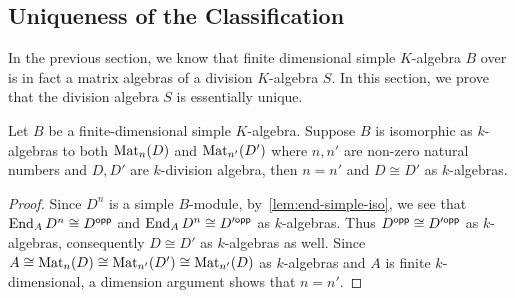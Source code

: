 \subsection{Uniqueness of the Classification}\label{sec:wed-artin-unique}
In the previous section, we know that finite dimensional simple $K$-algebra $B$
over is in fact a matrix algebras of a division $K$-algebra $S$. In this
section, we prove that the division algebra $S$ is essentially unique.

\begin{theorem}\label{thm:wed-artin-uniq}
  Let $B$ be a
  finite-dimensional simple $K$-algebra. Suppose $B$ is isomorphic as
  $k$-algebras to both $\operatorname{Mat}_{n}(D)$ and $\operatorname{Mat}_{n'}(D')$ where $n, n'$ are
  non-zero natural numbers and $D, D'$ are $k$-division algebra, then $n = n'$
  and $D \cong D'$ as $k$-algebras.\label{thm:wed-artin-unique} \leanok
\end{theorem}

\begin{proof}
  Since $D^{n}$ is a simple $B$-module, by~\cref{lem:end-simple-iso}, we see
  that $\operatorname{End}_{A}D^{n}\cong D^{\mathsf{opp}}$ and $\operatorname{End}_{A}D^{n}\cong D'^{\mathsf{opp}}$ as
  $k$-algebras. Thus $D^{\mathsf{opp}}\cong D'^{\mathsf{opp}}$ as $k$-algebras, consequently
  $D\cong D'$ as $k$-algebras as well. Since
  $A \cong \operatorname{Mat}_{n}(D)\cong \operatorname{Mat}_{n'}(D')\cong \operatorname{Mat}_{n'}(D)$ as $k$-algebras and
  $A$ is finite $k$-dimensional, a dimension argument shows that $n=n'$.
\end{proof}

